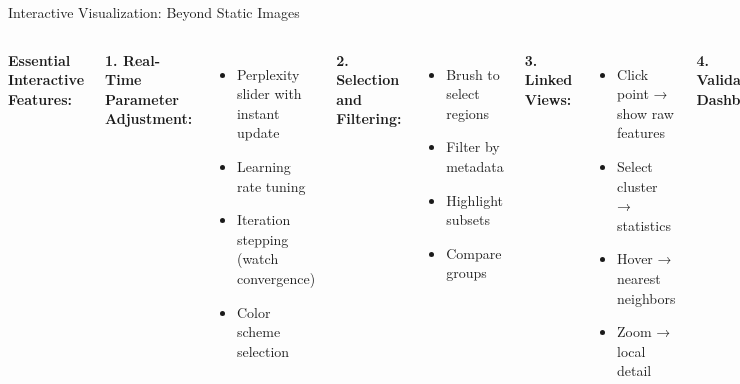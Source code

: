 \documentclass[aspectratio=169]{beamer}
\begin{document}
\begin{frame}{Interactive Visualization: Beyond Static Images}
\begin{columns}
\textbf{Essential Interactive Features:}

\textbf{1. Real-Time Parameter Adjustment:}
\begin{itemize}
\item Perplexity slider with instant update
\item Learning rate tuning
\item Iteration stepping (watch convergence)
\item Color scheme selection
\end{itemize}

\textbf{2. Selection and Filtering:}
\begin{itemize}
\item Brush to select regions
\item Filter by metadata
\item Highlight subsets
\item Compare groups
\end{itemize}

\textbf{3. Linked Views:}
\begin{itemize}
\item Click point → show raw features
\item Select cluster → statistics
\item Hover → nearest neighbors
\item Zoom → local detail
\end{itemize}

\textbf{4. Validation Dashboard:}
\begin{itemize}
\item NPr metric display
\item Convergence plot
\item Stability heatmap
\item Multiple run comparison
\end{itemize}

\textbf{Architecture Considerations:}

\end{columns}
\end{frame}
\end{document}
